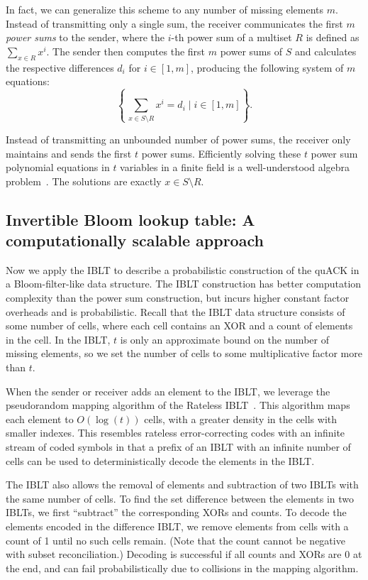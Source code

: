 In fact, we can generalize this scheme to any number of missing elements $m$.
Instead of transmitting only a single sum, the receiver communicates
the first $m$ \emph{power sums} to the sender, where the $i$-th power sum of a
multiset $R$ is defined as $\sum_{x \in R} x^i$.
The sender then computes the first $m$ power sums of $S$ and calculates the
respective differences $d_i$ for $i \in [1,m]$, producing the following
system of $m$ equations:
\[
    \left\{\, \sum_{x \in S\setminus R} x^i = d_i \mid i \in [1,m] \right\}.
\]

Instead of transmitting an unbounded number of power sums, the receiver only
maintains and sends the first $t$ power sums. Efficiently solving these $t$
power sum polynomial equations in $t$ variables in a finite field is a
well-understood algebra problem~\cite{eppstein2011straggler}. The solutions are
exactly $x \in S \setminus R$.

\subsection{Invertible Bloom lookup table: A computationally scalable approach}
\label{sec:quack:constructions:iblt}

Now we apply the IBLT to describe a probabilistic construction of the quACK in
a Bloom-filter-like data structure. The IBLT construction has better computation
complexity than the power sum construction, but incurs higher constant factor
overheads and is probabilistic.
Recall that the IBLT data structure consists of some number of cells, where each
cell contains an XOR and a count of elements in the cell. In the IBLT, $t$ is
only an approximate bound on the number of missing elements, so we set the
number of cells to some multiplicative factor more than $t$.

When the sender or receiver adds an element to the IBLT, we leverage the
pseudorandom mapping algorithm of the Rateless IBLT~\cite
{yang2024practical}. This algorithm maps each element to $O(\log(t))$ cells,
with a greater density in the cells with smaller indexes. This resembles
rateless error-correcting codes with an infinite stream of coded symbols in
that a prefix of an IBLT with an infinite number of cells can be used to
deterministically decode the elements in the IBLT.

The IBLT also allows the removal of elements and subtraction of two IBLTs with
the same number of cells. To find the set difference between the elements in
two IBLTs, we first ``subtract'' the corresponding XORs and counts. To decode
the elements encoded in the difference IBLT, we remove elements from cells with
a count of 1 until no such cells remain. (Note that the count cannot be
negative with subset reconciliation.) Decoding is successful if all counts
and XORs are 0 at the end, and can fail probabilistically due to collisions in
the mapping algorithm.

